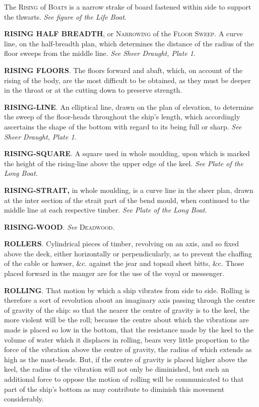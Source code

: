 The \textsc{Rising} of \textsc{Boats} is a narrow strake of board fastened within side to support the thwarts. \textit{See figure of the Life Boat}.

\textbf{RISING HALF BREADTH}, or \textsc{Narrowing} of the \textsc{Floor Sweep}. A curve line, on the half-breadth plan, which determines the distance of the radius of the floor sweeps from the middle line. \textit{See Sheer Draught, Plate 1}. 

\textbf{RISING FLOORS}. The floors forward and abaft, which, on account of the rising of the body, are the most difficult to be obtained, as they must be deeper in the throat or at the cutting down to preserve strength. 

\textbf{RISING-LINE}. An elliptical line, drawn on the plan of elevation, to determine the sweep of the floor-heads throughout the ship's length, which accordingly ascertains the shape of the bottom with regard to its being full or sharp. \textit{See Sheer Draught, Plate 1}. 

\textbf{RISING-SQUARE}. A square used in whole moulding, upon which is marked the height of the rising-line above the upper edge of the keel. \textit{See Plate of the Long Boat}. 

\textbf{RISING-STRAIT,} in whole moulding, is a curve line in the sheer plan, drawn at the inter section of the strait part of the bend mould, when continued to the middle line at each respective timber. \textit{See Plate of the Long Boat}. 

\textbf{RISING-WOOD}. \textit{See} \textsc{Deadwood}. 

\textbf{ROLLERS}. Cylindrical pieces of timber, revolving on an axis, and so fixed above the deck, either horizontally or perpendicularly, as to prevent the chaffing of the cable or hawser, \&c. against the jear and topsail sheet bitts, \&c. Those placed forward in the manger are for the use of the voyal or messenger. 

\textbf{ROLLING}. That motion by which a ship vibrates from side to side. Rolling is therefore a sort of revolution about an imaginary axis passing through the centre of gravity of the ship: so that the nearer the centre of gravity is to the keel, the more violent will be the roll; because the centre about which the vibrations are made is placed so low in the bottom, that the resistance made by the keel to the volume of water which it displaces in rolling, bears very little proportion to the force of the vibration above the centre of gravity, the radius of which extends as high as the mast-heads. But, if the centre of gravity is placed higher above the keel, the radius of the vibration will not only be diminished, but such an additional force to oppose the motion of rolling will be communicated to that part of the ship’s bottom as may contribute to diminish this movement considerably. 


